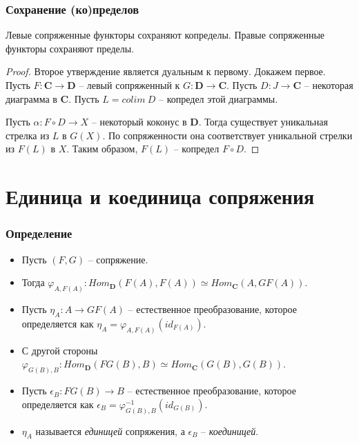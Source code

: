 \documentclass{beamer}
\theoremstyle{definition}
\newcommand{\cat}[1]{\mathbf{#1}}
\renewcommand{\C}{\cat{C}}
\newcommand{\D}{\cat{D}}
\begin{document}
\begin{frame}
\frametitle{Сохранение (ко)пределов}
\begin{prop}
Левые сопряженные функторы сохраняют копределы.
Правые сопряженные функторы сохраняют пределы.
\end{prop}
\begin{proof}
Второе утверждение является дуальным к первому.
Докажем первое.
Пусть $F : \C \to \D$ -- левый сопряженный к $G : \D \to \C$.
Пусть $D : J \to \C$ -- некоторая диаграмма в $\C$.
Пусть $L = colim\ D$ -- копредел этой диаграммы.

Пусть $\alpha : F \circ D \to X$ -- некоторый коконус в $\D$.
Тогда существует уникальная стрелка из $L$ в $G(X)$.
По сопряженности она соответствует уникальной стрелки из $F(L)$ в $X$.
Таким образом, $F(L)$ -- копредел $F \circ D$.
\end{proof}
\end{frame}

\section{Единица и коединица сопряжения}

\begin{frame}
\frametitle{Определение}
\begin{itemize}
\item Пусть $(F, G)$ -- сопряжение.
\item Тогда $\varphi_{A,F(A)} : Hom_\D(F(A), F(A)) \simeq Hom_\C(A, GF(A))$.
\item Пусть $\eta_A : A \to GF(A)$ -- естественное преобразование, которое определяется как $\eta_A = \varphi_{A,F(A)}(id_{F(A)})$.
\item С другой стороны $\varphi_{G(B),B} : Hom_\D(FG(B), B) \simeq Hom_\C(G(B), G(B))$.
\item Пусть $\epsilon_B : FG(B) \to B$ -- естественное преобразование, которое определяется как $\epsilon_B = \varphi^{-1}_{G(B),B}(id_{G(B)})$.
\item $\eta_A$ называется \emph{единицей} сопряжения, а $\epsilon_B$ -- \emph{коединицей}.
\end{itemize}
\end{frame}
\end{document}
